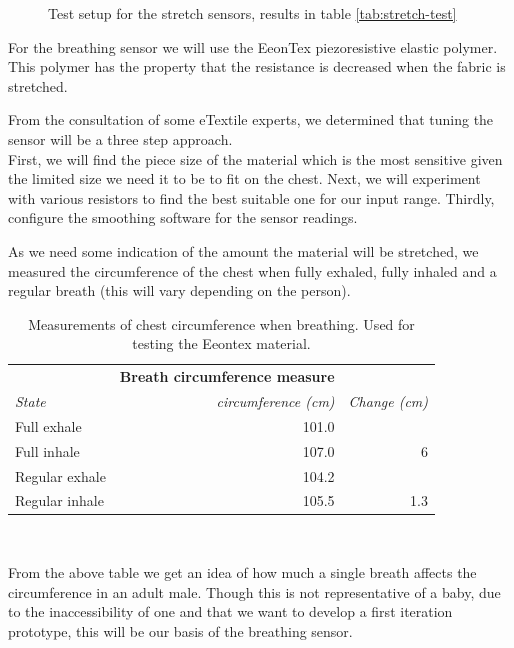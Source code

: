 \documentclass{sigchi-ext}
\begin{document}
{{\begin{minipage}{0.925\marginparwidth}
\begin{figure} [H]
    \caption{Test setup for the stretch sensors, results in table \ref{tab:stretch-test}}
\end{figure}
    \end{minipage}}\label{sec:sidebar} }

For the breathing sensor we will use the EeonTex piezoresistive elastic polymer.
This polymer has the property that the resistance is decreased when the fabric
is stretched.

From the consultation of some eTextile experts, we determined
that tuning the sensor will be a three step approach.\\
First, we will find the piece size of the material which
is the most sensitive given the limited size we need it to be
to fit on the chest. Next, we will experiment with various
resistors to find the best suitable one for our input range.
Thirdly, configure the smoothing software for the sensor readings.

As we need some indication of the amount the material will
be stretched, we measured the circumference of the chest
when fully exhaled, fully inhaled and a regular breath
(this will vary depending on the person).
\begin{table}[H]
  \centering
  \begin{tabular}{l r r}
    & \multicolumn{1}{r}{\small{\textbf{Breath circumference measure}}} \\
    \cmidrule(r){2-3}
    {\small\textit{State}}
    & {\small \textit{circumference (cm)}}
    & {\small \textit{Change (cm)}}\\
    \midrule
    Full exhale    & 101.0 & \\
    Full inhale    & 107.0 & 6\\
    Regular exhale & 104.2 & \\
    Regular inhale & 105.5 & 1.3 \\
  \end{tabular}
  \caption{Measurements of chest circumference when breathing. Used for testing the Eeontex material.}~\label{tab:circumference}
\end{table}
From the above table we get an idea of how much a single breath affects the circumference
in an adult male. Though this is not representative of a baby, due to the
inaccessibility of one and that we want to develop a first iteration prototype, this
will be our basis of the breathing sensor.
\end{document}
